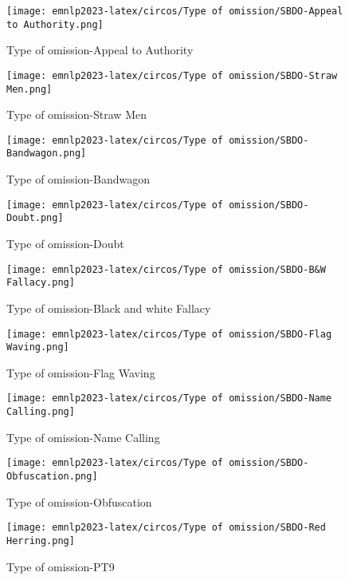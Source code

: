 \begin{figure*}[htbp]
    \begin{subfigure}[b]{0.33\textwidth}
    \centering
        \texttt{[image: emnlp2023-latex/circos/Type of omission/SBDO-Appeal to Authority.png]}
        \caption{Type of omission-Appeal to Authority}
    \end{subfigure}
    \begin{subfigure}[b]{0.33\textwidth}
    \centering
        \texttt{[image: emnlp2023-latex/circos/Type of omission/SBDO-Straw Men.png]}
        \caption{Type of omission-Straw Men}
    \end{subfigure}    
    \begin{subfigure}[b]{0.33\textwidth}
    \centering
        \texttt{[image: emnlp2023-latex/circos/Type of omission/SBDO-Bandwagon.png]}
        \caption{Type of omission-Bandwagon}
    \end{subfigure}
    \begin{subfigure}[b]{0.33\textwidth}
    \centering
        \texttt{[image: emnlp2023-latex/circos/Type of omission/SBDO-Doubt.png]}
        \caption{Type of omission-Doubt}
    \end{subfigure}
    \begin{subfigure}[b]{0.33\textwidth}
    \centering
        \texttt{[image: emnlp2023-latex/circos/Type of omission/SBDO-B\&W Fallacy.png]}
        \caption{Type of omission-Black and white Fallacy}
    \end{subfigure}
    \begin{subfigure}[b]{0.33\textwidth}
    \centering
        \texttt{[image: emnlp2023-latex/circos/Type of omission/SBDO-Flag Waving.png]}
        \caption{Type of omission-Flag Waving}
    \end{subfigure}
    \begin{subfigure}[b]{0.33\textwidth}
    \centering
        \texttt{[image: emnlp2023-latex/circos/Type of omission/SBDO-Name Calling.png]}
        \caption{Type of omission-Name Calling}
    \end{subfigure}
    \begin{subfigure}[b]{0.33\textwidth}
    \centering
        \texttt{[image: emnlp2023-latex/circos/Type of omission/SBDO-Obfuscation.png]}
        \caption{Type of omission-Obfuscation}
    \end{subfigure}
    \begin{subfigure}[b]{0.33\textwidth}
    \centering
        \texttt{[image: emnlp2023-latex/circos/Type of omission/SBDO-Red Herring.png]}
        \caption{Type of omission-PT9}
    \end{subfigure}
\end{figure*}


